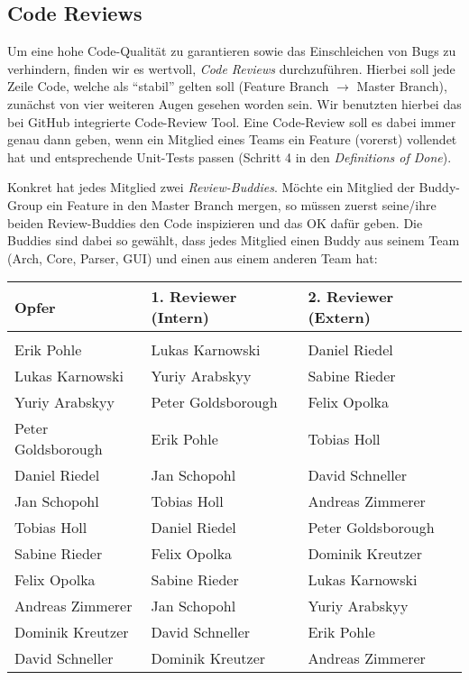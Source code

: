 \subsection{Code Reviews}

Um eine hohe Code-Qualität zu garantieren sowie das Einschleichen von Bugs zu
verhindern, finden wir es wertvoll, \emph{Code Reviews} durchzuführen. Hierbei
soll jede Zeile Code, welche als ``stabil'' gelten soll (Feature Branch
$\rightarrow$ Master Branch), zunächst von vier weiteren Augen gesehen worden
sein. Wir benutzten hierbei das bei GitHub integrierte Code-Review Tool. Eine
Code-Review soll es dabei immer genau dann geben, wenn ein Mitglied eines Teams
ein Feature (vorerst) vollendet hat und entsprechende Unit-Tests passen (Schritt
4 in den \emph{Definitions of Done}).

Konkret hat jedes Mitglied zwei \emph{Review-Buddies}. Möchte ein Mitglied der
Buddy-Group ein Feature in den Master Branch mergen, so müssen zuerst seine/ihre
beiden Review-Buddies den Code inspizieren und das OK dafür geben. Die Buddies
sind dabei so gewählt, dass jedes Mitglied einen Buddy aus seinem Team (Arch,
Core, Parser, GUI) und einen aus einem anderen Team hat:

\begin{table}[h!]
  \centering
  \begin{tabular}{lll}
    \textbf{Opfer} & \textbf{1. Reviewer (Intern)} & \textbf{2. Reviewer (Extern)} \\
    \toprule \\
    Erik Pohle & Lukas Karnowski & Daniel Riedel \\
    Lukas Karnowski & Yuriy Arabskyy &  Sabine Rieder \\
    Yuriy Arabskyy & Peter Goldsborough & Felix Opolka \\
    Peter Goldsborough & Erik Pohle & Tobias Holl \\

    Daniel Riedel & Jan Schopohl & David Schneller \\
    Jan Schopohl & Tobias Holl & Andreas Zimmerer \\
    Tobias Holl & Daniel Riedel & Peter Goldsborough \\

    Sabine Rieder & Felix Opolka & Dominik Kreutzer \\
    Felix Opolka & Sabine Rieder & Lukas Karnowski \\
    Andreas Zimmerer & Jan Schopohl & Yuriy Arabskyy \\

    Dominik Kreutzer & David Schneller & Erik Pohle \\
    David Schneller & Dominik Kreutzer &  Andreas Zimmerer \\
    \bottomrule
  \end{tabular}
\end{table}

